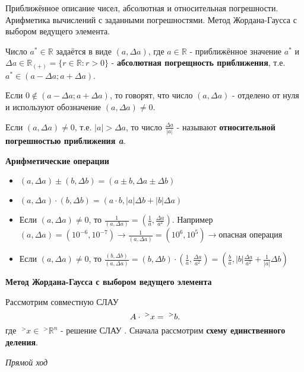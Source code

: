 \documentclass[__main__.tex]{subfiles}
\begin{document}
Приближённое описание чисел, абсолютная и относительная погрешности. Арифметика вычислений с заданными погрешностями. Метод Жордана-Гаусса с выбором ведущего элемента.

Число $a^{*} \in \mathbb{R}$ задаётся в виде $(a,\Delta a)$, где $a \in \mathbb{R}$ - приближённое значение $a^{*}$ и $\Delta a \in \mathbb{R}_{(+)} = \lbrace r \in \mathbb{R}: r>0 \rbrace$ - \textbf{абсолютная погрещность приближения}, т.е. $a^{*} \in (a - \Delta a; a + \Delta a)$.

Если $0 \notin (a - \Delta a; a + \Delta a)$, то говорят, что число $(a,\Delta a)$ - отделено от нуля и используют обозначение $(a,\Delta a) \neq 0$.

Если $(a,\Delta a) \neq 0$, т.е. $|a| > \Delta a$, то число $\frac{\Delta a}{|a|}$ - называют \textbf{относительной погрешностью приближения \textit{a}}.

\textbf{Арифметические операции}
\begin{itemize}
	\item 
	$(a,\Delta a) \pm (b,\Delta b) = (a \pm b,\Delta a \pm \Delta b) $ 
	
	\item 
	$(a,\Delta a) \cdot (b,\Delta b) = (a \cdot b,|a| \Delta b + |b| \Delta a) $
	
	\item 
	Если $(a,\Delta a) \neq 0$, то $\frac{1}{(a,\Delta a)} = \left(\frac{1}{a}, \frac{\Delta a}{a^2} \right)$. Например $(a,\Delta a) = (10^{-6},10^{-7}) \rightarrow \frac{1}{(a,\Delta a)} = (10^6,10^5) \rightarrow \text{опасная операция}$
	
	\item
	Если $(a,\Delta a) \neq 0$, то $\frac{(b, \Delta b)}{(a, \Delta a)} = (b,\Delta b) \cdot \left( \frac{1}{a}, \frac{\Delta a}{a^2} \right) = \left( \frac{b}{a}, |b| \frac{\Delta a}{a^2} + \frac{1}{|a|} \Delta b \right)$
\end{itemize}

\textbf{Метод Жордана-Гаусса с выбором ведущего элемента}

Рассмотрим совместную СЛАУ
\begin{equation}
\llabel{1_1}
A \cdot \;^{>}x = \;^{>}b.
\end{equation}
где $\;^{>}x \in \;^{>}\mathbb{R}^n$ - решение СЛАУ . Сначала рассмотрим \textbf{схему единственного деления}.

\textit{Прямой ход}
\end{document}
